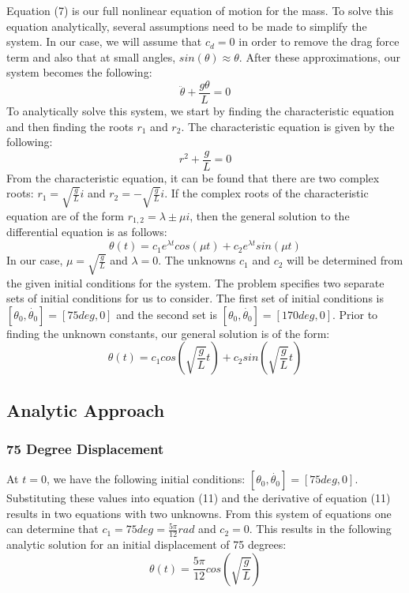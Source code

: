 \documentclass{article}
\begin{document}
	Equation (7) is our full nonlinear equation of motion for the mass. To solve this equation analytically, several assumptions need to be made to simplify the system. In our case, we will assume that $c_d = 0$ in order to remove the drag force term and also that at small angles, $sin(\theta)\approx \theta$. After these approximations, our system becomes the following: 
	\begin{equation}
	\ddot{\theta} + \frac{g\theta}{L} = 0
	\end{equation}
To analytically solve this system, we start by finding the characteristic equation and then finding the roots $r_1$ and $r_2$. The characteristic equation is given by the following:
	\begin{equation}
	r^2 + \frac{g}{L} = 0
	\end{equation}
From the characteristic equation, it can be found that there are two complex roots: $r_1 = \sqrt{\frac{g}{L}}i$ and $r_2 = -\sqrt{\frac{g}{L}}i$. If the complex roots of the characteristic equation are of the form $r_{1,2} = \lambda\pm\mu i$, then the general solution to the differential equation is as follows: 
	\begin{equation}
	\theta(t) = c_1e^{\lambda t}cos(\mu t)+c_2e^{\lambda t}sin(\mu t)
	\end{equation}
In our case, $\mu=\sqrt{\frac{g}{L}}$ and $\lambda = 0$. The unknowns $c_1$ and $c_2$ will be determined from the given initial conditions for the system. The problem specifies two separate sets of initial conditions for us to consider. The first set of initial conditions is $[\theta_0, \dot{\theta_0}] = [75deg, 0]$ and the second set is $[\theta_0, \dot{\theta_0}] = [170deg, 0]$. Prior to finding the unknown constants, our general solution is of the form:
	\begin{equation}
\theta(t) = c_1cos(\sqrt{\frac{g}{L}} t)+c_2sin(\sqrt{\frac{g}{L}}t)
\end{equation}

\subsection{Analytic Approach}

\subsubsection{75 Degree Displacement}

At $t = 0$, we have the following initial conditions: $[\theta_0, \dot{\theta_0}] = [75deg, 0]$. Substituting these values into equation (11) and the derivative of equation (11) results in two equations with two unknowns. From this system of equations one can determine that $c_1 = 75 deg = \frac{5\pi}{12} rad$ and $c_2 = 0$. This results in the following analytic solution for an initial displacement of 75 degrees: 
	\begin{equation}
	\theta(t) = \frac{5\pi}{12}cos(\sqrt{\frac{g}{L}})
\end{equation}	 
\end{document}
